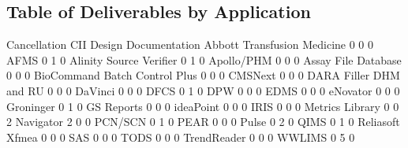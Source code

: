 \documentclass{article}
\begin{document}
\subsection{Table of Deliverables by Application}
\begin{Schunk}
\begin{Soutput}
                                Cancellation CII Design Documentation
  Abbott Transfusion Medicine              0   0                    0
  AFMS                                     0   1                    0
  Alinity Source Verifier                  0   1                    0
  Apollo/PHM                               0   0                    0
  Assay File Database                      0   0                    0
  BioCommand Batch Control Plus            0   0                    0
  CMSNext                                  0   0                    0
  DARA Filler DHM and RU                   0   0                    0
  DaVinci                                  0   0                    0
  DFCS                                     0   1                    0
  DPW                                      0   0                    0
  EDMS                                     0   0                    0
  eNovator                                 0   0                    0
  Groninger                                0   1                    0
  GS Reports                               0   0                    0
  ideaPoint                                0   0                    0
  IRIS                                     0   0                    0
  Metrics Library                          0   0                    2
  Navigator                                2   0                    0
  PCN/SCN                                  0   1                    0
  PEAR                                     0   0                    0
  Pulse                                    0   2                    0
  QIMS                                     0   1                    0
  Reliasoft Xfmea                          0   0                    0
  SAS                                      0   0                    0
  TODS                                     0   0                    0
  TrendReader                              0   0                    0
  WWLIMS                                   0   5                    0
                               

\end{Soutput}
\end{Schunk}
\end{document}
